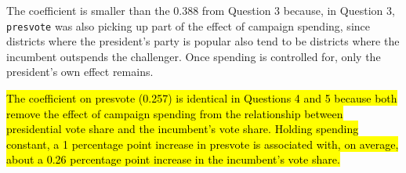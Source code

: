\documentclass[12pt,letterpaper]{article}
\begin{document}
\begin{enumerate}
		The coefficient is smaller than the 0.388 from Question 3 because, in Question 3, \texttt{presvote} was also picking up part of the effect of campaign spending, since districts where the president's party is popular also tend to be districts where the incumbent outspends the challenger. Once spending is controlled for, only the president's own effect remains.
		
		\hl{The coefficient on presvote (0.257) is identical in Questions 4 and 5 because both remove the effect of campaign spending from the relationship between presidential vote share and the incumbent's vote share. Holding spending constant, a 1 percentage point increase in presvote is associated with, on average, about a 0.26 percentage point increase in the incumbent's vote share.}
	\end{enumerate}
\end{document}
